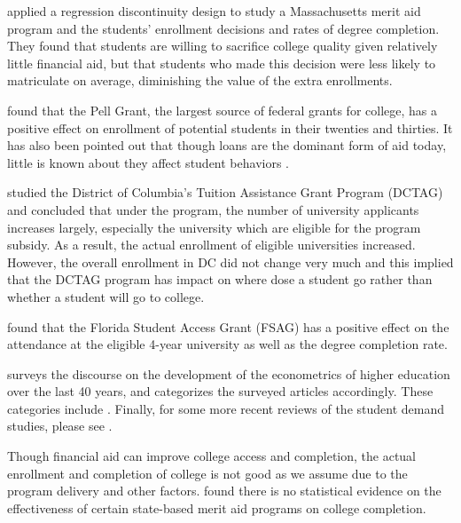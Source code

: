 \documentclass[12pt,english]{report}
\begin{document}
\citet{Cohodes2014} applied a regression discontinuity design to study a Massachusetts merit aid 
program and the students' enrollment decisions and rates of degree completion.  They found that 
students are willing to sacrifice college quality given relatively little financial aid, but that 
students who made this decision were less likely to matriculate on average, diminishing the value 
of the extra enrollments.

\citet{Turner2002} found that the Pell Grant, the largest source of federal grants for college, 
has a positive effect on enrollment of potential students in their twenties and thirties.  It has 
also been pointed out that though loans are the dominant form of aid today, little is known about 
they affect student behaviors \citep{Dynarski2013}. 

\citet{Abraham2006} studied the District of Columbia's Tuition Assistance Grant Program (DCTAG) and concluded that under the program, the number of university applicants increases largely,
especially the university which are eligible for the program subsidy. As a result, the actual
enrollment of eligible universities increased. However, the overall enrollment in DC did not
change very much and this implied that the DCTAG program has impact on where dose a student go
rather than whether a student will go to college.

\citet{Castleman2016} found that the Florida Student Access Grant (FSAG) has a positive effect 
on the attendance at the eligible 4-year university as well as the degree completion rate.


\citet{Ehrenberg2004} surveys the discourse on the development of the econometrics of higher 
education over the last 40 years, and categorizes the surveyed articles accordingly. These 
categories include .
Finally, for some more recent 
reviews of the student demand studies, please see \citep{Dynarski2002, Dynarski2003, 
Dynarski2000, Dynarski2013}.

Though financial aid can improve college access and completion, the actual enrollment and
completion of college is not good as we assume due to the program delivery and other factors.
\citet{Winters2015}  found there is 
no statistical evidence on the effectiveness of certain state-based merit aid programs on 
college completion.
\end{document}
